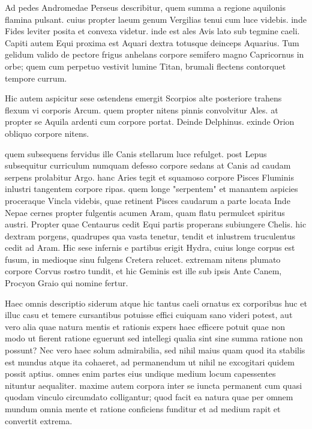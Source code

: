  Ad pedes Andromedae Perseus describitur, quem summa a regione aquilonis flamina pulsant. cuius propter laeum genum Vergilias tenui cum luce videbis. inde Fides leviter posita et convexa videtur. inde est ales Avis lato sub tegmine caeli. Capiti autem Equi proxima est Aquari dextra totusque deinceps Aquarius. Tum gelidum valido de pectore frigus anhelans corpore semifero magno Capricornus in orbe; quem cum perpetuo vestivit lumine Titan, brumali flectens contorquet tempore currum.

 Hic autem aspicitur sese ostendens emergit Scorpios alte posteriore trahens flexum vi corporis Arcum. quem propter nitens pinnis convolvitur Ales. at propter se Aquila ardenti cum corpore portat. Deinde Delphinus. exinde Orion obliquo corpore nitens.

 quem subsequens fervidus ille Canis stellarum luce refulget. post Lepus subsequitur curriculum numquam defesso corpore sedans at Canis ad caudam serpens prolabitur Argo. hanc Aries tegit et squamoso corpore Pisces Fluminis inlustri tangentem corpore ripas. quem longe "serpentem" et manantem aspicies proceraque Vincla videbis, quae retinent Pisces caudarum a parte locata Inde Nepae cernes propter fulgentis acumen Aram, quam flatu permulcet spiritus austri. Propter quae Centaurus cedit Equi partis properans subiungere Chelis. hic dextram porgens, quadrupes qua vasta tenetur, tendit et inlustrem truculentus cedit ad Aram. Hic sese infernis e partibus erigit Hydra, cuius longe corpus est fusum, in medioque sinu fulgens Cretera relucet. extremam nitens plumato corpore Corvus rostro tundit, et hic Geminis est ille sub ipsis Ante Canem, Procyon Graio qui nomine fertur.

 Haec omnis descriptio siderum atque hic tantus caeli ornatus ex corporibus huc et illuc casu et temere cursantibus potuisse effici cuiquam sano videri potest, aut vero alia quae natura mentis et rationis expers haec efficere potuit quae non modo ut fierent ratione eguerunt sed intellegi qualia sint sine summa ratione non possunt? Nec vero haec solum admirabilia, sed nihil maius quam quod ita stabilis est mundus atque ita cohaeret, ad permanendum ut nihil ne excogitari quidem possit aptius. omnes enim partes eius undique medium locum capessentes nituntur aequaliter. maxime autem corpora inter se iuncta permanent cum quasi quodam vinculo circumdato colligantur; quod facit ea natura quae per omnem mundum omnia mente et ratione conficiens funditur et ad medium rapit et convertit extrema.


